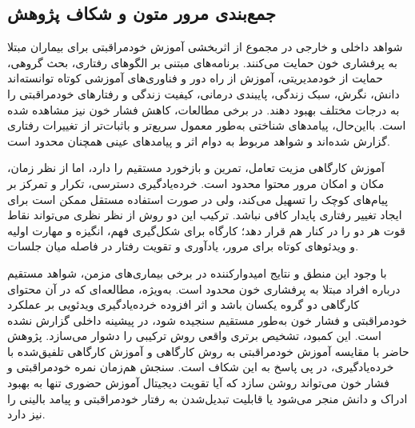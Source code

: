 \subsection{جمع‌بندی مرور متون و شکاف پژوهش}
شواهد داخلی و خارجی در مجموع از اثربخشی آموزش خودمراقبتی برای بیماران مبتلا به پرفشاری خون حمایت می‌کنند. برنامه‌های مبتنی بر الگوهای رفتاری، بحث گروهی، حمایت از خودمدیریتی، آموزش از راه دور و فناوری‌های آموزشی کوتاه توانسته‌اند دانش، نگرش، سبک زندگی، پایبندی درمانی، کیفیت زندگی و رفتارهای خودمراقبتی را به درجات مختلف بهبود دهند. در برخی مطالعات، کاهش فشار خون نیز مشاهده شده است. بااین‌حال، پیامدهای شناختی به‌طور معمول سریع‌تر و باثبات‌تر از تغییرات رفتاری گزارش شده‌اند و شواهد مربوط به دوام اثر و پیامدهای عینی همچنان محدود است.
\par
آموزش کارگاهی مزیت تعامل، تمرین و بازخورد مستقیم را دارد، اما از نظر زمان، مکان و امکان مرور محتوا محدود است. خرده‌یادگیری دسترسی، تکرار و تمرکز بر پیام‌های کوچک را تسهیل می‌کند، ولی در صورت استفاده مستقل ممکن است برای ایجاد تغییر رفتاری پایدار کافی نباشد. ترکیب این دو روش از نظر نظری می‌تواند نقاط قوت هر دو را در کنار هم قرار دهد؛ کارگاه برای شکل‌گیری فهم، انگیزه و مهارت اولیه و ویدئوهای کوتاه برای مرور، یادآوری و تقویت رفتار در فاصله میان جلسات.
\par
با وجود این منطق و نتایج امیدوارکننده در برخی بیماری‌های مزمن، شواهد مستقیم درباره افراد مبتلا به پرفشاری خون محدود است. به‌ویژه، مطالعه‌ای که در آن محتوای کارگاهی دو گروه یکسان باشد و اثر افزوده خرده‌یادگیری ویدئویی بر عملکرد خودمراقبتی و فشار خون به‌طور مستقیم سنجیده شود، در پیشینه داخلی گزارش نشده است. این کمبود، تشخیص برتری واقعی روش ترکیبی را دشوار می‌سازد. پژوهش حاضر با مقایسه آموزش خودمراقبتی به روش کارگاهی و آموزش کارگاهی تلفیق‌شده با خرده‌یادگیری، در پی پاسخ به این شکاف است. سنجش هم‌زمان نمره خودمراقبتی و فشار خون می‌تواند روشن سازد که آیا تقویت دیجیتال آموزش حضوری تنها به بهبود ادراک و دانش منجر می‌شود یا قابلیت تبدیل‌شدن به رفتار خودمراقبتی و پیامد بالینی را نیز دارد.

